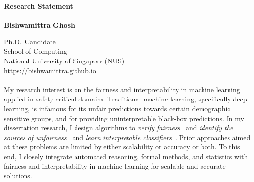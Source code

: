 \documentclass[11pt]{article}
\newcommand{\blue}[1]{\textcolor{blue}{#1}}
\begin{document}
	\noindent\huge \textbf{Research Statement} \\
	\vspace{0.1em}\\
	\Large \textbf{Bishwamittra Ghosh}
		
	\normalsize
	\noindent Ph.D.\ Candidate\\
	School of Computing\\
	National University of Singapore (NUS)\\
	\blue{\url{https://bishwamittra.github.io}}



	\paragraph{}
	My research interest is on the fairness and interpretability in machine learning applied in safety-critical domains. Traditional machine learning, specifically deep learning, is infamous for its unfair predictions towards certain demographic sensitive groups, and for providing uninterpretable black-box predictions. In my dissertation research, I design algorithms to \textit{verify fairness}~\cite{ghosh2021justicia,ghosh2022algorithmic} and \textit{identify the sources of unfairness}~\cite{ghosh2022how} and  \textit{learn interpretable classifiers}~\cite{ghosh22efficient,ghosh2019incremental,ghosh2020classification}. Prior approaches aimed at these problems are limited by either scalability or accuracy or both. To this end, I closely integrate automated reasoning, formal methods, and statistics with fairness and interpretability in machine learning for scalable and accurate solutions.
	
	
	
	
\end{document}
